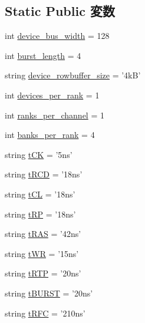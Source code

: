\subsection*{Static Public 変数}
\begin{DoxyCompactItemize}
\item 
int \hyperlink{classDRAMCtrl_1_1WideIO__200__x128_ac980afb64b962aec673eeadb21ea8b0e}{device\_\-bus\_\-width} = 128
\item 
int \hyperlink{classDRAMCtrl_1_1WideIO__200__x128_afeba385888f1ce3063d25f20c0e7a89b}{burst\_\-length} = 4
\item 
string \hyperlink{classDRAMCtrl_1_1WideIO__200__x128_ab24d9a52c5c94331e40478cc93e9abe1}{device\_\-rowbuffer\_\-size} = '4kB'
\item 
int \hyperlink{classDRAMCtrl_1_1WideIO__200__x128_a60039c77757fd0118d81754311d71cfb}{devices\_\-per\_\-rank} = 1
\item 
int \hyperlink{classDRAMCtrl_1_1WideIO__200__x128_ab610af52b1f27db17e9de304176a80a8}{ranks\_\-per\_\-channel} = 1
\item 
int \hyperlink{classDRAMCtrl_1_1WideIO__200__x128_ac43360fda587200e99a090d69163e089}{banks\_\-per\_\-rank} = 4
\item 
string \hyperlink{classDRAMCtrl_1_1WideIO__200__x128_a78016df5bd6c91551bcf487d3d665ebe}{tCK} = '5ns'
\item 
string \hyperlink{classDRAMCtrl_1_1WideIO__200__x128_a31691ebf1f58ff89b00f261f5adea8e2}{tRCD} = '18ns'
\item 
string \hyperlink{classDRAMCtrl_1_1WideIO__200__x128_a009c2614e5d317cb4805a4a98ace1b19}{tCL} = '18ns'
\item 
string \hyperlink{classDRAMCtrl_1_1WideIO__200__x128_aeda425967c3cf2880bdc1640e9733439}{tRP} = '18ns'
\item 
string \hyperlink{classDRAMCtrl_1_1WideIO__200__x128_a1b5f15dad9d492ce5d0167e1581de8cc}{tRAS} = '42ns'
\item 
string \hyperlink{classDRAMCtrl_1_1WideIO__200__x128_a9d8360f5123eaf9b5b6013adca83d1ae}{tWR} = '15ns'
\item 
string \hyperlink{classDRAMCtrl_1_1WideIO__200__x128_ac0793c2fe127d7331efb7012e82dae77}{tRTP} = '20ns'
\item 
string \hyperlink{classDRAMCtrl_1_1WideIO__200__x128_af962cc8ff13de9c28027368562b67c1e}{tBURST} = '20ns'
\item 
string \hyperlink{classDRAMCtrl_1_1WideIO__200__x128_a05307f048be759575436bb4a58206f04}{tRFC} = '210ns'
\item 

\end{DoxyCompactItemize}
